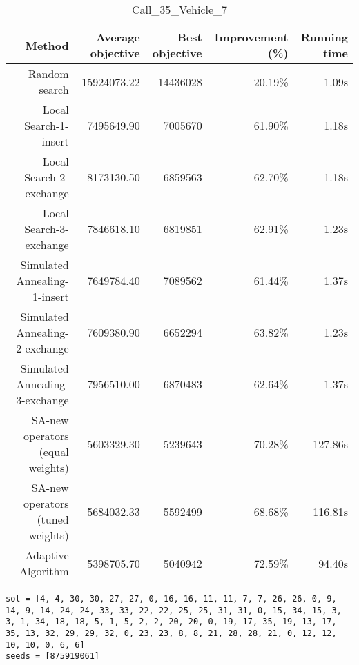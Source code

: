 \begin{table}[ht]
\centering
\caption{Call\_35\_Vehicle\_7}
\label{tab:call35vehicle7}
\begin{tabular}{|r|r|r|r|r|}
Method & Average objective & Best objective & Improvement (\%) & Running time \\
\hline
Random search & 15924073.22 & 14436028 & 20.19\% & 1.09s\\
Local Search-1-insert & 7495649.90 & 7005670 & 61.90\% & 1.18s\\
Local Search-2-exchange & 8173130.50 & 6859563 & 62.70\% & 1.18s\\
Local Search-3-exchange & 7846618.10 & 6819851 & 62.91\% & 1.23s\\
Simulated Annealing-1-insert & 7649784.40 & 7089562 & 61.44\% & 1.37s\\
Simulated Annealing-2-exchange & 7609380.90 & 6652294 & 63.82\% & 1.23s\\
Simulated Annealing-3-exchange & 7956510.00 & 6870483 & 62.64\% & 1.37s\\
SA-new operators (equal weights) & 5603329.30 & 5239643 & 70.28\% & 127.86s\\
SA-new operators (tuned weights) & 5684032.33 & 5592499 & 68.68\% & 116.81s\\
Adaptive Algorithm & 5398705.70 & 5040942 & 72.59\% & 94.40s\\
\end{tabular}%
\end{table}
\begin{lstlisting}[label={lst:call35vehicle7},caption=Optimal solution call\_35\_vehicle\_7]
sol = [4, 4, 30, 30, 27, 27, 0, 16, 16, 11, 11, 7, 7, 26, 26, 0, 9, 14, 9, 14, 24, 24, 33, 33, 22, 22, 25, 25, 31, 31, 0, 15, 34, 15, 3, 3, 1, 34, 18, 18, 5, 1, 5, 2, 2, 20, 20, 0, 19, 17, 35, 19, 13, 17, 35, 13, 32, 29, 29, 32, 0, 23, 23, 8, 8, 21, 28, 28, 21, 0, 12, 12, 10, 10, 0, 6, 6]
seeds = [875919061]
\end{lstlisting}%
\clearpage



